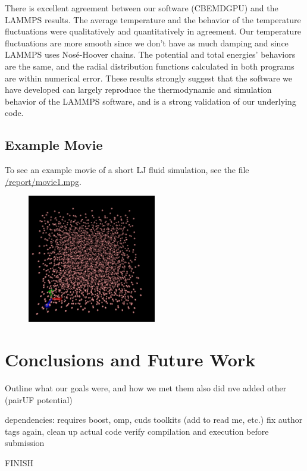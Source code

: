 \documentclass[12pt]{article}
\begin{document}
There is excellent agreement between our software (CBEMDGPU) and the LAMMPS results. The average temperature and the behavior of the temperature fluctuations were qualitatively and quantitatively in agreement. Our temperature fluctuations are more smooth since we don't have as much damping and since LAMMPS uses Nos\'{e}-Hoover chains. The potential and total energies' behaviors are the same, and the radial distribution functions calculated in both programs are within numerical error. These results strongly suggest that the software we have developed can largely reproduce the thermodynamic and simulation behavior of the LAMMPS software, and is a strong validation of our underlying code.

\subsection{Example Movie}
To see an example movie of a short LJ fluid simulation, see the file \url{/report/movie1.mpg}.
\begin{figure}[H]
	\begin{center}
    	\includegraphics[width=0.5\textwidth]{vmd_image.png}
	\end{center}
\end{figure}
\section{Conclusions and Future Work}

Outline what our goals were, and how we met them
also did nve
added other (pairUF potential)

dependencies: requires boost, omp, cuds toolkits (add to read me, etc.)
fix author tags again, clean up actual code
verify compilation and execution before submission

FINISH

\pagebreak


\end{document}
